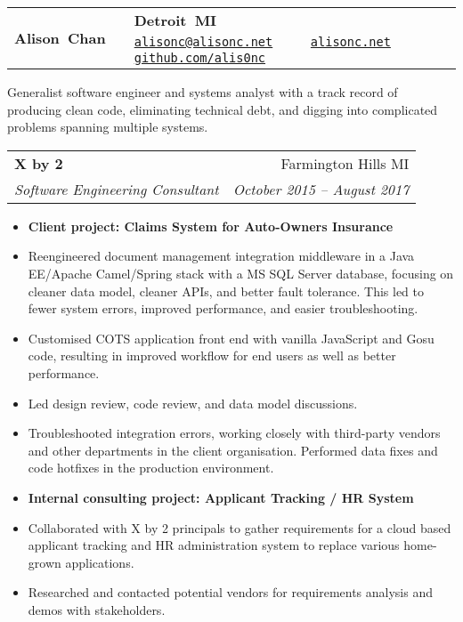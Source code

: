 \documentclass[letterpaper,10pt]{article}
\makeatletter
\newlength{\listsep}
\newcommand{\resitem}[1]{\item #1 \vspace{-2pt}}
\newcommand{\resheading}[1]{\vspace{4pt}
  \parbox{\textwidth}{
      \framebox[\textwidth][l]{
          {\textbf{\sffamily{\large #1}}}
      }
  }
}
\newcommand{\ressubheading}[4]{
\begin{tabular*}{\textwidth}{l@{\cftdotfill{\cftsecdotsep}\extracolsep{\fill}}r}
        \textbf{#1} & #2 \\
        \textit{#3} & \textit{#4} \\
\end{tabular*}\vspace{-6pt}}
\makeatother
\begin{document}
\ifdef{\MONSTER}{\def\PUBLIC{}}{}
\ifdef{\DICE}{\def\PUBLIC{}}{}

\begin{tabular}{b{4cm} c b{12cm}}
	\textbf{\huge Alison~Chan} & \hspace{6pt} & \parbox[b]{12cm}{\textbf{Detroit~MI} \\
		\href{mailto:alisonc@alisonc.net}{\nolinkurl{alisonc@alisonc.net}}~\textbullet~%
		~\textbullet~%
		\href{https://alisonc.net/}{\nolinkurl{alisonc.net}}~\textbullet~%
		\href{https://github.com/alis0nc}{\nolinkurl{github.com/alis0nc}}}
\end{tabular}
\vspace{4pt}

{\large
Generalist software engineer and systems analyst with a track record of producing clean code, eliminating technical debt,
and digging into complicated problems spanning multiple systems. 
}

\resheading{Professional Experience}


\ressubheading{X by 2}{Farmington Hills MI}{Software Engineering Consultant}{October 2015 -- August 2017}
\begin{itemize}\itemsep \listsep  \small
	\resitem{{\bf Client project: Claims System for Auto-Owners Insurance}}
	\resitem{Reengineered document management integration middleware in a Java EE/Apache Camel/Spring stack with a MS SQL Server database, focusing on cleaner data model, cleaner APIs,
		and better fault tolerance. This led to fewer system errors, improved performance, and easier troubleshooting.}
	\resitem{Customised COTS application front end with vanilla JavaScript and Gosu code, resulting in improved workflow for end users as well as better performance.}
	\resitem{Led design review, code review, and data model discussions.}
	\resitem{Troubleshooted integration errors, working closely with third-party vendors and other departments in the client 
		organisation. Performed data fixes and code hotfixes in the production environment.}
	\resitem{{\bf Internal consulting project: Applicant Tracking / HR System}}
	\resitem{Collaborated with X by 2 principals to gather requirements for a cloud based applicant tracking
		and HR administration system to replace various home-grown applications.}
	\resitem{Researched and contacted potential vendors for requirements analysis and demos with stakeholders.}
\end{itemize}
\end{document}

